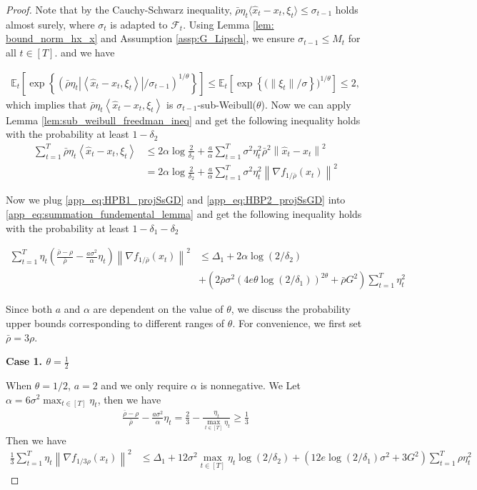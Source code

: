 \documentclass{article}
\def \E {\mathbb{E}}
\def \brho {\bar{\rho}}
\def \hx {\hat{x}}
\def \sumT {\sum_{t=1}^T}
\def \fbrho {f_{1/\brho}}
\def \nab {\nabla}
\newcommand{\Et}[1]{\E_t\left[#1\right]}
\newcommand{\Exp}[1]{\exp\left\{#1\right\}}
\newcommand{\norm}[2][]{\left\|#2\right\|^{#1}}
\newcommand{\innerdot}[2]{\left\langle #1 , #2 \right\rangle}
\newcommand{\Brace}[1]{\left(#1\right)}
\begin{document}
\begin{proof}
Note that by the Cauchy-Schwarz inequality, $\brho\eta_t\langle \hx_t-x_t, \xi_t\rangle \leq \sigma_{t-1}$ holds almost surely, where $\sigma_t$ is adapted to $\mathcal{F}_t$. Using Lemma \ref{lem: bound_norm_hx_x} and Assumption \ref{assp:G_Lipsch}, we ensure $\sigma_{t-1} \leq M_t$ for all $t \in [T]$. and we have

\begin{align}
    \Et{\Exp{\Brace{\brho\eta_t|\innerdot{\hx_t-x_t}{\xi_t}|/\sigma_{t-1}}^{1/\theta}}} \leq \Et{\Exp{(\|\xi_t\|/\sigma})^{1/\theta}} \leq 2,
\end{align}
which implies that $\brho\eta_t\innerdot{\hx_t-x_t}{\xi_t}$ is $\sigma_{t-1}$-sub-Weibull($\theta$). Now we can apply Lemma \ref{lem:sub_weibull_freedman_ineq} and get the following inequality holds with the probability at least $1-\delta_2$
\begin{align}\label{app_eq:HBP2_projSsGD}
    \sumT \brho\eta_t\innerdot{\hx_t-x_t}{\xi_t}&\leq 2\alpha\log{\frac{2}{\delta_2}}+\frac{a}{\alpha}\sumT \sigma^2\eta_t^2 \brho^2\norm[2]{\hx_t-x_t}\nonumber\\
    &= 2\alpha\log{\frac{2}{\delta_2}}+\frac{a}{\alpha}\sumT \sigma^2\eta_t^2 \norm[2]{\nab \fbrho(x_t)}
\end{align}

Now we plug \eqref{app_eq:HPB1_projSsGD} and \eqref{app_eq:HBP2_projSsGD} into \eqref{app_eq:summation_fundemental_lemma} and get the following inequality holds with the probability at least $1-\delta_1-\delta_2$

\begin{align}
    \sumT \eta_t\Brace{\frac{\brho-\rho}{\brho}-\frac{a\sigma^2}{\alpha}\eta_t}\norm[2]{\nab \fbrho(x_t)} &\leq \Delta_1 + 2\alpha\log(2/\delta_2)\nonumber\\ &+\Brace{2\brho\sigma^2(4e\theta\log(2/\delta_1))^{2\theta}+\brho G^2}\sumT\eta_t^2
\end{align}

Since both $a$ and $\alpha$ are dependent on the value of $\theta$, we discuss the probability upper bounds corresponding to different ranges of $\theta$. For convenience, we first set $\brho = 3\rho$.

\textbf{Case 1. $\theta=\frac{1}{2}$}

When $\theta=1/2$, $a=2$ and we only require $\alpha$ is nonnegative. We Let $\alpha=6\sigma^2\max_{t\in[T]}\eta_t$, then we have
\begin{align}
    \frac{\brho-\rho}{\brho}-\frac{a\sigma^2}{\alpha}\eta_t=\frac{2}{3} - \frac{\eta_t}{\max_{t\in[T]}\eta_t}\geq\frac{1}{3}
\end{align}
Then we have
\begin{align}
    \frac{1}{3}\sumT \eta_t\norm[2]{\nab f_{1/3\rho}(x_t)}&\leq \Delta_1 + 12\sigma^2\max_{t\in[T]}\eta_t\log(2/\delta_2)+ \Brace{12e\log(2/\delta_1)\sigma^2+3G^2}\sumT \rho\eta_t^2 
\end{align}


\end{proof}
\end{document}
